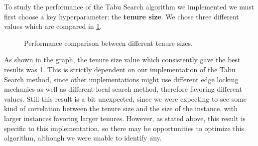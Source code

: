 To study the performance of the Tabu Search algorithm we implemented we must first choose a key hyperparameter: the \textbf{tenure size}.
We chose three different values which are compared in \figurename{ \ref{fig:tabuParmTune}}.

\begin{figure}[htbp]
	\centering
	\caption{Performance comparison between different tenure sizes.} \label{fig:tabuParmTune}
\end{figure}

As shown in the graph, the tenure size value which consistently gave the best results was 1.
This is strictly dependent on our implementation of the Tabu Search method, since other implementations might use different edge locking mechanics as well as different local search method, therefore favoring different values. %
Still this result is a bit unexpected, since we were expecting to see some kind of correlation between the tenure size and the size of the instance, with larger instances favoring larger tenures.
However, as stated above, this result is specific to this implementation, so there may be opportunities to optimize this algorithm, although we were unable to identify any.

